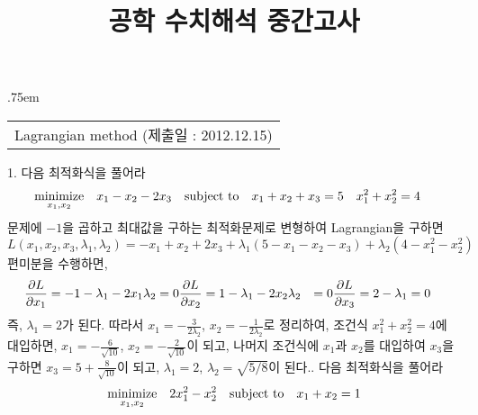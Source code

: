 \documentclass[a4,10pt]{article}
\title{공학 수치해석 중간고사}
\author{}
\makeatletter
\theoremstyle{examplestyle}
\let\\\tabularnewline
\let\\\tabularnewline
\renewcommand{\tableofcontents}[1][\contentsname]{%
  \section*{#1}
  \begin{multicols}{2}
    \@starttoc{toc}
  \end{multicols}
}
\makeatother
\begin{document}
\begin{center}
{\lineskip .75em\begin{tabular}[t]{c}\LARGE{Lagrangian method} \large{(제출일 : 2012.12.15)}\end{tabular}\par}%
\end{center}
1. 다음 최적화식을 풀어라
\begin{equation*}
\begin{aligned}
& \underset{x_{1},x_{2}}{\text{minimize}}& & x_{1}-x_{2}-2x_{3}\\
& \text{subject to}& & x_{1}+x_{2}+x_{3}=5\\
& & & x_{1}^{2}+x_{2}^{2}=4\\
\end{aligned}
\end{equation*}
 문제에 $-1$을 곱하고 최대값을 구하는 최적화문제로 변형하여 Lagrangian을 구하면
\begin{equation*}
L(x_{1},x_{2},x_{3},\lambda_{1},\lambda_{2})=-x_{1}+x_{2}+2x_{3}+\lambda_{1}(5-x_{1}-x_{2}-x_{3})+\lambda_{2}(4-x_{1}^{2}-x_{2}^{2})
\end{equation*}
편미분을 수행하면,
\begin{align*}
\frac{\partial L}{\partial x_{1}}=-1-\lambda_{1}-2x_{1}\lambda_{2}&=0\\
\frac{\partial L}{\partial x_{2}}=1-\lambda_{1}-2x_{2}\lambda_{2}&=0\\
\frac{\partial L}{\partial x_{3}}=2-\lambda_{1}&=0\\
\end{align*}
즉, $\lambda_{1}=2$가 된다. 따라서 $x_{1}=-\frac{3}{2\lambda_{2}}$, $x_{2}=-\frac{1}{2\lambda_{2}}$로 정리하여, 조건식 $x_{1}^{2}+x_{2}^{2}=4$에 대입하면, $x_{1}=-\frac{6}{\sqrt{10}}$, $x_{2}=-\frac{2}{\sqrt{10}}$이 되고, 나머지 조건식에 $x_{1}$과 $x_{2}$를 대입하여 $x_{3}$을 구하면 $x_{3}=5+\frac{8}{\sqrt{10}}$이 되고, $\lambda_{1}=2$, $\lambda_{2}=\sqrt{5/8}$이 된다.\\
2. 다음 최적화식을 풀어라
\begin{equation*}
\begin{aligned}
& \underset{x_{1},x_{2}}{\text{minimize}}& & 2x_{1}^2-x_{2}^2\\
& \text{subject to}& & x_{1}+x_{2}=1\\
\end{aligned}
\end{equation*}
\end{document}
